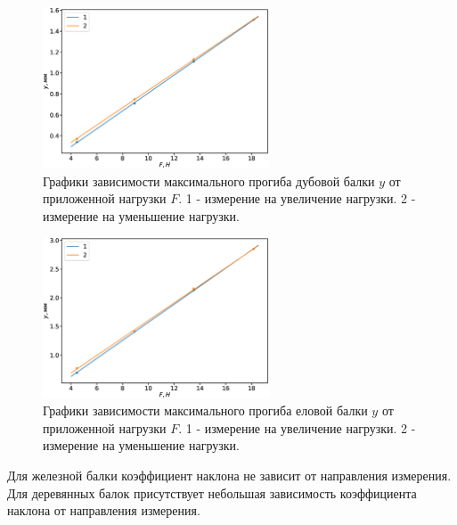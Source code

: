 \documentclass[12pt]{article}
\begin{document}
\begin{figure}[H]
    \begin{center}
        \includegraphics[width=0.6\textwidth]{groupdown_wood1.eps}
    \end{center}
    \caption{Графики зависимости максимального прогиба дубовой балки $y$ от приложенной нагрузки $F$. 1 - измерение на увеличение нагрузки.
        2 - измерение на уменьшение нагрузки.}
    \label{fig:3}
\end{figure}

\begin{figure}[H]
    \begin{center}
        \includegraphics[width=0.6\textwidth]{groupdown_wood2.eps}
    \end{center}
    \caption{Графики зависимости максимального прогиба еловой балки $y$ от приложенной нагрузки $F$. 1 - измерение на увеличение нагрузки.
        2 - измерение на уменьшение нагрузки.}
    \label{fig:4}
\end{figure}

Для железной балки коэффициент наклона не зависит от направления измерения. Для деревянных балок присутствует небольшая зависимость коэффициента
наклона от направления измерения.
\end{document}
